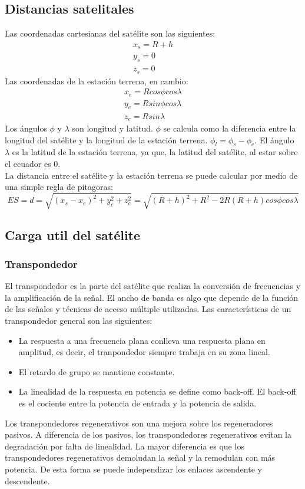 	\subsection{Distancias satelitales}
	\label{sub:distSatelite}
		Las coordenadas cartesianas del satélite son las siguientes: 
		\begin{gather*}
			x_s=R+h\\
			y_s=0\\
			z_s=0
		\end{gather*}
		Las coordenadas de la estación terrena, en cambio:
		\begin{gather*}
			x_e=Rcos\phi cos\lambda\\
			y_e=Rsin\phi cos\lambda\\
			z_e=Rsin\lambda
		\end{gather*}
		Los ángulos $\phi$ y $\lambda$ son longitud y latitud. $\phi$ se calcula como la diferencia entre la longitud del satélite y la longitud de la estación terrena. $\phi_l=\phi_s-\phi_e$. El ángulo $\lambda$ es la latitud de la estación terrena, ya que, la latitud del satélite, al estar sobre el ecuador es 0.\\
		La distancia entre el satélite y la estación terrena se puede calcular por medio de una simple regla de pitagoras:
		\begin{equation}
			\tag{Distancia al satélite}
			ES=d=\sqrt{(x_s-x_e)^2+y_e^2+z_e^2}=\sqrt{(R+h)^2+R^2-2R(R+h)cos\phi cos\lambda}
		\end{equation}
	\subsection{Carga util del satélite}
	\label{sub:satUtil}
		\subsubsection{Transpondedor}
		\label{ssub:transpondedor}
			El transpondedor es la parte del satélite que realiza la conversión de frecuencias y la amplificación de la señal. El ancho de banda es algo que depende de la función de las señales y técnicas de acceso múltiple utilizadas. Las características de un transpondedor general son las siguientes:
			\begin{itemize}
				\item La respuesta a una frecuencia plana conlleva una respuesta plana en amplitud, es decir, el tranpondedor siempre trabaja en su zona lineal.
				\item El retardo de grupo se mantiene constante.
				\item La linealidad de la respuesta en potencia se define como back-off. El back-off es el cociente entre la potencia de entrada y la potencia de salida.
			\end{itemize}
			Los transpondedores regenerativos son una mejora sobre los regeneradores pasivos. A diferencia de los pasivos, los transpondedores regenerativos evitan la degradación por falta de linealidad. La mayor diferencia es que los transpondedores regenerativos demoludan la señal y la remodulan con más potencia. De esta forma se puede independizar los enlaces ascendente y descendente.
		
